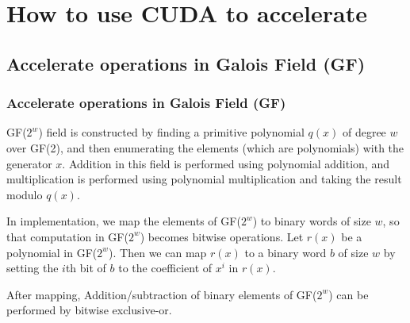 \documentclass[slidestop,compress,mathserif]{beamer}
\begin{document}
\section{How to use CUDA to accelerate} %
\subsection{Accelerate operations in Galois Field (GF)} %
\begin{frame}[options]
\frametitle{Accelerate operations in Galois Field (GF)}
GF($2^w$) field is constructed by finding a primitive polynomial $q(x)$ of degree $w$ over GF(2), and then enumerating the elements (which are polynomials) with the generator $x$.
Addition in this field is performed using polynomial addition, and multiplication is performed using polynomial multiplication and taking the result modulo $q(x)$.

{
In implementation, we
map the elements of GF($2^w$) to binary words of size $w$, so that computation in GF($2^w$) becomes bitwise operations.
Let $r(x)$ be a polynomial in GF($2^w$). Then we can map $r(x)$ to a binary word $b$ of size $w$ by setting the $i$th bit of $b$ to the coefficient of $x^i$ in $r(x)$.
}

{
After mapping, 
Addition/subtraction of binary elements of GF($2^w$) can be performed by bitwise exclusive-or. 
}
\end{frame}
\end{document}
